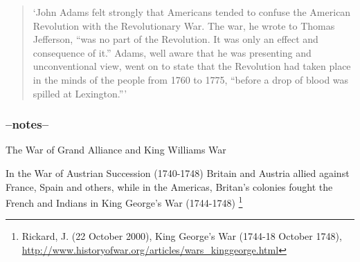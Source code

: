 \begin{quote}
  `John Adams felt strongly that Americans tended to confuse the American 
  Revolution with the Revolutionary War. The war, he wrote to Thomas Jefferson,
  ``was no part of the Revolution. It was only an effect and consequence of it.''
  Adams, well aware that he was presenting and unconventional view, went on to
  state that the Revolution had taken place in the minds of the people from 1760
  to 1775, ``before a drop of blood was spilled at
  Lexington.'''\cite[15]{dupuy_1977}
\end{quote}



\subsubsection{--notes--}

\singlespace


The War of Grand Alliance and King Williams War 

In the War of Austrian Succession (1740-1748) Britain and Austria allied against
France, Spain and others, while in the Americas, Britan's colonies fought the
French and Indians in King George's War (1744-1748) \footnote{Rickard, J. (22
October 2000), King George's War (1744-18 October 1748),
\url{http://www.historyofwar.org/articles/wars_kinggeorge.html}}


\begin{quotation}\end{quotation}

\begin{quotation}\end{quotation}

